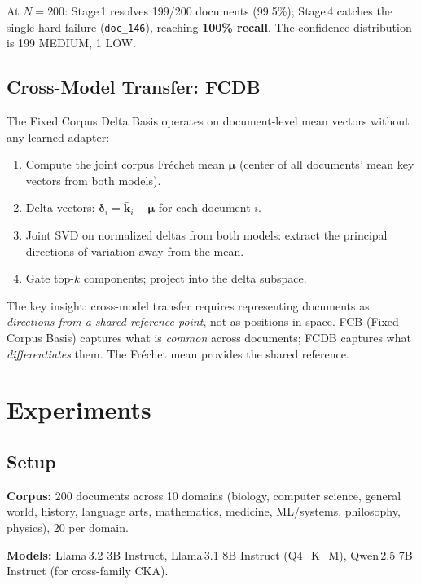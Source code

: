\documentclass[11pt,twocolumn]{article}
\newcommand{\fcdb}{\textsc{FCDB}}
\begin{document}
At $N{=}200$: Stage\,1 resolves 199/200 documents (99.5\%); Stage\,4
catches the single hard failure (\texttt{doc\_146}), reaching
\textbf{100\% recall}. The confidence distribution is 199 MEDIUM, 1 LOW.

\subsection{Cross-Model Transfer: FCDB}
\label{sec:fcdb}

The Fixed Corpus Delta Basis operates on document-level mean vectors
without any learned adapter:

\begin{enumerate}[leftmargin=*,itemsep=1pt]
\item Compute the joint corpus Fr\'echet mean $\boldsymbol{\mu}$
  (center of all documents' mean key vectors from both models).
\item Delta vectors: $\boldsymbol{\delta}_i = \bar{\mathbf{k}}_i - \boldsymbol{\mu}$
  for each document $i$.
\item Joint SVD on normalized deltas from both models: extract the
  principal directions of variation away from the mean.
\item Gate top-$k$ components; project into the delta subspace.
\end{enumerate}

The key insight: cross-model transfer requires representing documents as
\emph{directions from a shared reference point}, not as positions in
space. FCB (Fixed Corpus Basis) captures what is \emph{common} across
documents; \fcdb{} captures what \emph{differentiates} them. The
Fr\'echet mean provides the shared reference.

\section{Experiments}
\label{sec:experiments}

\subsection{Setup}

\textbf{Corpus:} 200 documents across 10 domains (biology, computer
science, general world, history, language arts, mathematics, medicine,
ML/systems, philosophy, physics), 20 per domain.

\textbf{Models:} Llama\,3.2 3B Instruct, Llama\,3.1 8B Instruct
(Q4\_K\_M), Qwen\,2.5 7B Instruct (for cross-family CKA).
\end{document}
